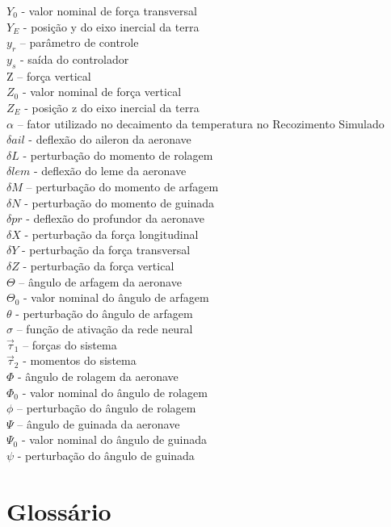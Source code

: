 \documentclass[10pt,a4paper]{article}
\numberwithin{equation}{section}
\begin{document}
$Y_0$ - valor nominal de força transversal\\
$Y_E$ - posição y do eixo inercial da terra\\
$y_r$ – parâmetro de controle\\
$y_s$ - saída do controlador\\
Z – força vertical \\
$Z_0$ - valor nominal de força vertical \\
$Z_E$  - posição z do eixo inercial da terra\\
$\alpha$ – fator utilizado no decaimento da temperatura no Recozimento Simulado\\
$\delta ail$ - deflexão do aileron da aeronave\\
$\delta L$ - perturbação do momento de rolagem\\
$\delta lem$ - deflexão do leme da aeronave \\
$\delta M$ – perturbação do momento de arfagem\\
$\delta N$ - perturbação do momento de guinada\\
$\delta pr$ - deflexão do profundor da aeronave \\ 
$\delta X$ - perturbação da força longitudinal\\
$\delta Y$ - perturbação da força transversal\\
$\delta Z$ - perturbação da força vertical\\
$\Theta$ – ângulo de arfagem da aeronave\\
$\Theta_0$ - valor nominal do ângulo de arfagem\\
$\theta$ - perturbação do ângulo de arfagem\\
$\sigma$ – função de ativação da rede neural\\
$\overrightarrow{\tau}_1$ – forças do sistema\\
$\overrightarrow{\tau}_2$ - momentos do sistema\\
$\Phi$ - ângulo de rolagem da aeronave\\
$\Phi_0$ - valor nominal do ângulo de rolagem\\
$\phi$ – perturbação do ângulo de rolagem\\
$\Psi$ – ângulo de guinada da aeronave\\
$\Psi_0$ - valor nominal do ângulo de guinada\\
$\psi$ - perturbação do ângulo de guinada\\

\newpage

\section*{Glossário}
\end{document}
